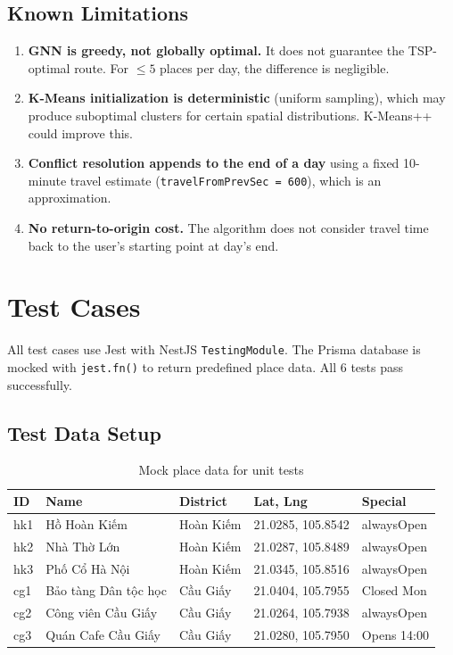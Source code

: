 \documentclass[12pt,a4paper]{report}
\begin{document}
\subsection{Known Limitations}

\begin{enumerate}
    \item \textbf{GNN is greedy, not globally optimal.} It does not guarantee the TSP-optimal route. For $\leq 5$ places per day, the difference is negligible.
    \item \textbf{K-Means initialization is deterministic} (uniform sampling), which may produce suboptimal clusters for certain spatial distributions. K-Means++ could improve this.
    \item \textbf{Conflict resolution appends to the end of a day} using a fixed 10-minute travel estimate (\texttt{travelFromPrevSec = 600}), which is an approximation.
    \item \textbf{No return-to-origin cost.} The algorithm does not consider travel time back to the user's starting point at day's end.
\end{enumerate}

\section{Test Cases}
\label{sec:test-cases}

All test cases use Jest with NestJS \texttt{TestingModule}. The Prisma database is mocked with \texttt{jest.fn()} to return predefined place data. All 6 tests pass successfully.

\subsection{Test Data Setup}

\begin{table}[H]
\centering
\small
\begin{tabular}{|l|l|l|l|l|}
\hline
\textbf{ID} & \textbf{Name} & \textbf{District} & \textbf{Lat, Lng} & \textbf{Special} \\
\hline
hk1 & Hồ Hoàn Kiếm & Hoàn Kiếm & 21.0285, 105.8542 & alwaysOpen \\
hk2 & Nhà Thờ Lớn & Hoàn Kiếm & 21.0287, 105.8489 & alwaysOpen \\
hk3 & Phố Cổ Hà Nội & Hoàn Kiếm & 21.0345, 105.8516 & alwaysOpen \\
cg1 & Bảo tàng Dân tộc học & Cầu Giấy & 21.0404, 105.7955 & Closed Mon \\
cg2 & Công viên Cầu Giấy & Cầu Giấy & 21.0264, 105.7938 & alwaysOpen \\
cg3 & Quán Cafe Cầu Giấy & Cầu Giấy & 21.0280, 105.7950 & Opens 14:00 \\
\hline
\end{tabular}
\caption{Mock place data for unit tests}
\end{table}
\end{document}
